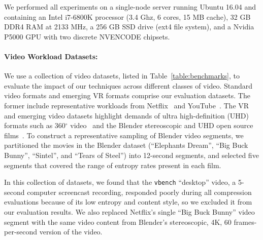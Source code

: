 We performed all experiments on a single-node server running Ubuntu 16.04 and containing an Intel i7-6800K processor (3.4 Ghz, 6 cores, 15 MB cache), 32 GB DDR4 RAM at 2133 MHz, a 256 GB SSD drive (ext4 file system), and a Nvidia P5000 GPU with two discrete NVENCODE chipsets.

\paragraph{Video Workload Datasets:} We use a collection of video datasets, listed in Table~\ref{table:benchmarks}, to evaluate the impact of our techniques across different classes of video.
Standard video formats and emerging VR formats comprise our evaluation datasets.
The former include representative workloads from Netflix~\cite{netflix2016data} and YouTube~\cite{vbench}.
The VR and emerging video datasets highlight demands of ultra high-definition (UHD) formats such as 360$^\circ$ video~\cite{saliency-map} and the Blender stereoscopic and UHD open source films~\cite{blender}.
To construct a representative sampling of Blender video segments, we partitioned the movies in the Blender dataset (``Elephants Dream'', ``Big Buck Bunny'', ``Sintel'', and ``Tears of Steel'') into 12-second segments, and selected five segments that covered the range of entropy rates present in each film.

\benchmarkInformationFigure

In this collection of datasets, we found that the \texttt{vbench} ``desktop'' video, a 5-second computer screencast recording, responded poorly during all compression evaluations because of its low entropy and content style, so we excluded it from our evaluation results.
We also replaced Netflix's single ``Big Buck Bunny'' video segment with the same video content from Blender's stereoscopic, 4K, 60 frames-per-second version of the video.

